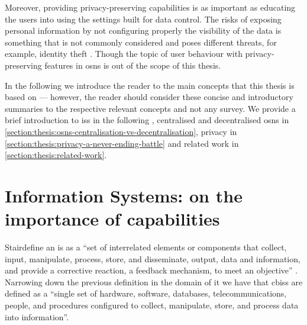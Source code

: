 Moreover, providing privacy-preserving capabilities is as important as educating 
the users into using the settings built for data control. The risks of exposing 
personal information by not configuring properly the visibility of the data is something 
that is not commonly considered and poses different threats, for example, identity 
theft \cite{GrossAH05, BrandtzaegLS10}. Though the topic of user behaviour with 
privacy-preserving features in \acp{osn} is out of the scope of this thesis.

In the following 
we introduce the reader to the main concepts that this thesis is based on --- however,
the reader should consider these  
concise and introductory summaries to the respective relevant concepts and not any 
survey. 
We provide a brief introduction to \acp{is} in the following ,
centralised and decentralised \acp{osn} in \cref{section:thesis:osns-centralisation-vs-decentralisation}, 
privacy in \cref{section:thesis:privacy-a-never-ending-battle} and related work 
in \cref{section:thesis:related-work}.

\section{Information Systems: on the importance of capabilities}
    \label{section:thesis:information-systems-on-the-importance-of-capabilities}

Stair\etal define an \ac{is} as a ``set of interrelated elements or components that 
collect, input, manipulate, process, store, and disseminate, output, data and information, 
and provide a corrective reaction, a feedback mechanism, to meet an objective'' 
\cite{StairR15}. Narrowing down the previous definition in the domain of \ac{it} 
we have that \acp{cbis} are defined as a ``single set of hardware, software, databases, 
telecommunications, people, and procedures configured to collect, manipulate, store, 
and process data into information''. 

